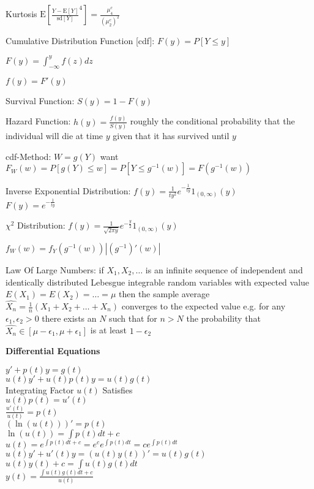 Kurtosis $\text{E}\left[ \frac{Y-\text{E}[Y]}{\text{sd}[Y]}^4 \right]=\frac{\mu_4^c}{(\mu_2^c)^2}$

Cumulative Distribution Function [cdf]: $F(y)=P[Y\le y]$

$F(y)=\int_{-\infty}^y f(z)dz$

$f(y)=F'(y)$

Survival Function: $S(y)=1-F(y)$

Hazard Function: $h(y)=\frac{f(y)}{S(y)}$ roughly the conditional probability that the individual will die at time $y$ given that it has survived until $y$

cdf-Method: $W=g(Y)$ want $F_W(w)=P[g(Y)\le w]=P[Y\le g^{-1}(w)]=F(g^{-1}(w))$

Inverse Exponential Distribution: $f(y)=\frac{1}{ty^2}e^{-\frac{1}{ty}}1_{(0,\infty)}(y)$ \\
$F(y)=e^{-\frac{1}{ty}}$

$\chi^2$ Distribution: $f(y)=\frac{1}{\sqrt{2\pi y}}e^{-\frac{y}{2}}1_{(0,\infty)}(y)$

$f_W(w)=f_Y(g^{-1}(w))|(g^{-1})'(w)|$

Law Of Large Numbers: if $X_1,X_2,\dots$ is an infinite sequence of independent and identically distributed Lebesgue integrable random variables with expected value $E(X_1)=E(X_2)=\dots =\mu$ then the sample average $\hat{X_n}=\frac{1}{n}(X_1+X_2+\dots+X_n)$ converges to the expected value e.g. for any $\epsilon_1, \epsilon_2 > 0$ there exists an $N$ such that for $n>N$ the probability that $\hat{X_n} \in [\mu - \epsilon_1,\mu+\epsilon_1]$ is at least $1-\epsilon_2$

\newpage

\textbf{Differential Equations}

$y'+p(t)y=g(t)$ \\
$u(t)y'+u(t)p(t)y=u(t)g(t)$ \\
Integrating Factor $u(t)$ Satisfies \\
$u(t)p(t)=u'(t)$ \\
$\frac{u'(t)}{u(t)}=p(t)$ \\
$(\ln(u(t)))'=p(t)$ \\
$\ln(u(t))=\int p(t) dt + c$ \\
$u(t)=e^{\int p(t) dt + c}=e^{c}e^{\int p(t) dt}=ce^{\int p(t) dt}$ \\
$u(t)y'+u'(t)y=(u(t)y(t))'=u(t)g(t)$ \\
$u(t)y(t)+c=\int u(t)g(t) dt$ \\
$y(t)=\frac{\int u(t)g(t) dt + c}{u(t)}$

